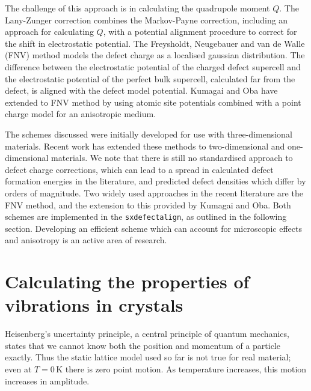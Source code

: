 The challenge of this approach is in calculating the quadrupole moment $Q$. 
The Lany-Zunger correction\cite{Lany2009} combines the Markov-Payne correction, including an approach for calculating $Q$, with a potential alignment procedure to correct for the shift in electrostatic potential. 
The Freysholdt, Neugebauer and van de Walle (FNV) method\cite{Freysoldt2009} models the defect charge as a localised gaussian distribution. 
The difference between the electrostatic potential of the charged defect supercell and the electrostatic potential of the perfect bulk supercell, calculated far from the defect, is aligned with the defect model potential. 
Kumagai and Oba have extended to FNV method by using atomic site potentials combined with a point charge model for an anisotropic medium.\cite{Kumagai2014} 

The schemes discussed were initially developed for use with three-dimensional materials. 
Recent work has extended these methods to two-dimensional\cite{Freysoldt2018,Komsa2013} and one-dimensional\cite{Kim2014} materials.
We note that there is still no standardised approach to defect charge corrections, 
which can lead to a spread in calculated defect formation energies in the literature, and predicted defect densities which differ by orders of magnitude.
Two widely used approaches in the recent literature are the FNV method, and the extension to this provided by Kumagai and Oba.
Both schemes are implemented in the \texttt{sxdefectalign}, as outlined in the following section.
Developing an efficient scheme which can account for microscopic effects and anisotropy is an active area of research.\cite{durrant2018,Vinichenko2017}


\section{Calculating the properties of vibrations in crystals} \label{sec:latticedynamics}

Heisenberg's uncertainty principle, a central principle of quantum mechanics, states that we cannot know both the position and momentum of a particle exactly. Thus the static lattice model used so far is not true for real material; even at $T=0\,\textrm{K}$ there is zero point motion. As temperature increases, this motion increases in amplitude.


